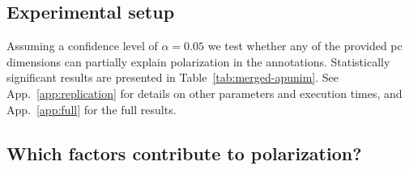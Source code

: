 \documentclass{article} %
\theoremstyle{definition}
\theoremstyle{plain}
\begin{document}
\subsection{Experimental setup}
\label{sec:results:experimental}

Assuming a confidence level of $\alpha=0.05$ we test whether any of the provided \ac{pc} dimensions can partially explain polarization in the annotations. Statistically significant results are presented in Table~\ref{tab:merged-apunim}. See App.~\ref{app:replication} for details on other parameters and execution times, and App.~\ref{app:full} for the full results.


\subsection{Which factors contribute to polarization?}
\label{ssec:results:factors}
\end{document}
